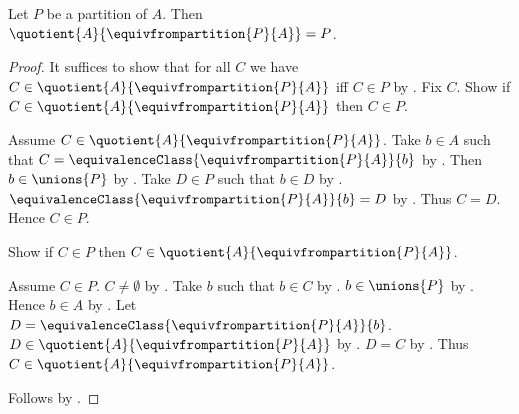 \begin{proposition}\label{partition_eq_quotient_by_equivalence_from_partition}
    Let $P$ be a partition of $A$.
    Then $\quotient{A}{\equivfrompartition{P}{A}} = P$.
\end{proposition}
\begin{proof}
    It suffices to show that for all $C$ we have
        $C\in\quotient{A}{\equivfrompartition{P}{A}}$ iff $C\in P$
        by .
    Fix $C$.
    Show if $C\in\quotient{A}{\equivfrompartition{P}{A}}$ then $C\in P$.
    \begin{subproof}
        Assume $C\in\quotient{A}{\equivfrompartition{P}{A}}$.
        Take $b\in A$ such that
            $C=\equivalenceClass{\equivfrompartition{P}{A}}{b}$
            by .
        Then $b\in\unions{P}$ by .
        Take $D\in P$ such that $b\in D$ by .
        $\equivalenceClass{\equivfrompartition{P}{A}}{b}=D$
            by .
        Thus $C=D$.
        Hence $C\in P$.
    \end{subproof}
    Show if $C\in P$ then
        $C\in\quotient{A}{\equivfrompartition{P}{A}}$.
    \begin{subproof}
        Assume $C\in P$.
        $C\neq\emptyset$ by .
        Take $b$ such that $b\in C$ by .
        $b\in\unions{P}$ by .
        Hence $b\in A$ by .
        Let $D=\equivalenceClass{\equivfrompartition{P}{A}}{b}$.
        $D\in\quotient{A}{\equivfrompartition{P}{A}}$ by .
        $D=C$ by .
        Thus $C\in\quotient{A}{\equivfrompartition{P}{A}}$.
    \end{subproof}
    Follows by \auto.
\end{proof}

